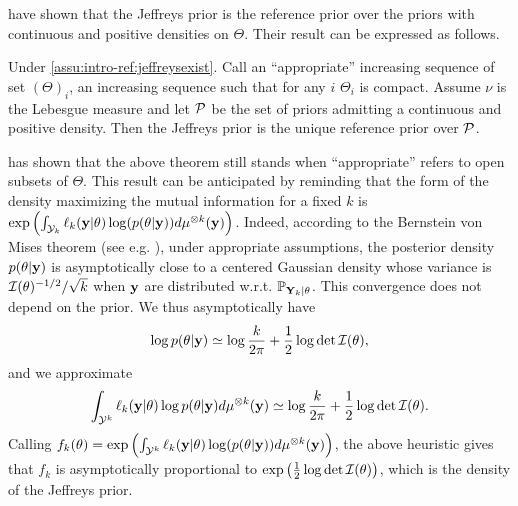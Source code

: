 \citet{clarke_jeffreys_1994} have shown that the Jeffreys prior  is the reference prior over the priors with continuous and positive densities on $\Theta$. Their result can be expressed as follows.
    \begin{thm}\label{thm:intro-ref:clarke}
        Under \cref{assu:intro-ref:jeffreysexist}. Call an ``appropriate'' increasing sequence of set $(\Theta)_i$, an increasing sequence such that for any $i$ $\Theta_i$ is compact. Assume $\nu$ is the Lebesgue measure and let $\mathcal{P}$ be the set of priors admitting a continuous and positive density. Then the Jeffreys prior is the unique reference prior over $\mathcal{P}$.
    \end{thm}
\citet{mure_objective_2018} has shown that the above theorem still stands when ``appropriate'' refers to open subsets of $\Theta$. {This result can be anticipated by reminding that the form of the density maximizing the mutual information for a fixed $k$ is $\exp\left(\int_{\mathcal{Y}_k}\ell_k(\mathbf{y}|\theta)\log(p(\theta|\mathbf{y}) ) d\mu^{\otimes k}(\mathbf{y})\right)$. 
Indeed, according to the Bernstein von Mises theorem (see e.g. \cite{van_der_vaart_asymptotic_1992}), under appropriate assumptions, the posterior density $p(\theta|\mathbf{y})$ is asymptotically close  to a %
centered Gaussian density whose  variance is $\mathcal{I}(\theta)^{-1/2}/\sqrt{k}$ when $\mathbf{y}$ are distributed w.r.t. $\mathbb{P}_{\mathbf{Y}_k|\theta}$.
This convergence does not depend {on} the prior. We thus asymptotically have
    \begin{equation}
        \log p(\theta|\mathbf{y})\simeq \log \frac{k}{2\pi}  +\frac{1}{2}\log\det\mathcal{I}(\theta),
    \end{equation}
and we approximate
\begin{equation}
    \int_{\mathcal{Y}^k} \ell_k(\mathbf{y}|\theta)\log p(\theta|\mathbf{y}) d\mu^{\otimes k}(\mathbf{y})\simeq \log\frac{k}{2\pi} + \frac{1}{2}\log\det\mathcal{I}(\theta).
\end{equation}
Calling $f_k(\theta) = \exp\left(\int_{\mathcal{Y}^k}\ell_k(\mathbf{y}|\theta)\log(p(\theta|\mathbf{y}))d\mu^{\otimes k}(\mathbf{y})  \right)$, the above heuristic gives that $f_k$ is asymptotically proportional to $\exp\left(\frac{1}{2}\log\det\mathcal{I}(\theta)\right)$, which is the density of the Jeffreys prior.}



